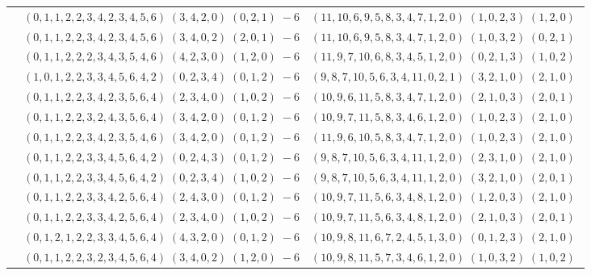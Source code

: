 \documentclass[11pt]{article}
\begin{document}
\begin{longtable}[l]{|c|c|c|}
 \cline{2-3} 
 & $(0 ,1 ,1 ,2 ,2 ,3 ,4 ,2 ,3 ,4 ,5 ,6) \;(3 ,4 ,2 ,0) \;(0 ,2 ,1) \;-6$ & $(11 ,10 ,6 ,9 ,5 ,8 ,3 ,4 ,7 ,1 ,2 ,0) \;(1 ,0 ,2 ,3) \;(1 ,2 ,0) \;$\\ 
 \cline{2-3} 
 & $(0 ,1 ,1 ,2 ,2 ,3 ,4 ,2 ,3 ,4 ,5 ,6) \;(3 ,4 ,0 ,2) \;(2 ,0 ,1) \;-6$ & $(11 ,10 ,6 ,9 ,5 ,8 ,3 ,4 ,7 ,1 ,2 ,0) \;(1 ,0 ,3 ,2) \;(0 ,2 ,1) \;$\\ 
 \cline{2-3} 
 & $(0 ,1 ,1 ,2 ,2 ,2 ,3 ,4 ,3 ,5 ,4 ,6) \;(4 ,2 ,3 ,0) \;(1 ,2 ,0) \;-6$ & $(11 ,9 ,7 ,10 ,6 ,8 ,3 ,4 ,5 ,1 ,2 ,0) \;(0 ,2 ,1 ,3) \;(1 ,0 ,2) \;$\\ 
 \cline{2-3} 
 & $(1 ,0 ,1 ,2 ,2 ,3 ,3 ,4 ,5 ,6 ,4 ,2) \;(0 ,2 ,3 ,4) \;(0 ,1 ,2) \;-6$ & $(9 ,8 ,7 ,10 ,5 ,6 ,3 ,4 ,11 ,0 ,2 ,1) \;(3 ,2 ,1 ,0) \;(2 ,1 ,0) \;$\\ 
 \cline{2-3} 
 & $(0 ,1 ,1 ,2 ,2 ,3 ,4 ,2 ,3 ,5 ,6 ,4) \;(2 ,3 ,4 ,0) \;(1 ,0 ,2) \;-6$ & $(10 ,9 ,6 ,11 ,5 ,8 ,3 ,4 ,7 ,1 ,2 ,0) \;(2 ,1 ,0 ,3) \;(2 ,0 ,1) \;$\\ 
 \cline{2-3} 
 & $(0 ,1 ,1 ,2 ,2 ,3 ,2 ,4 ,3 ,5 ,6 ,4) \;(3 ,4 ,2 ,0) \;(0 ,1 ,2) \;-6$ & $(10 ,9 ,7 ,11 ,5 ,8 ,3 ,4 ,6 ,1 ,2 ,0) \;(1 ,0 ,2 ,3) \;(2 ,1 ,0) \;$\\ 
 \cline{2-3} 
 & $(0 ,1 ,1 ,2 ,2 ,3 ,4 ,2 ,3 ,5 ,4 ,6) \;(3 ,4 ,2 ,0) \;(0 ,1 ,2) \;-6$ & $(11 ,9 ,6 ,10 ,5 ,8 ,3 ,4 ,7 ,1 ,2 ,0) \;(1 ,0 ,2 ,3) \;(2 ,1 ,0) \;$\\ 
 \cline{2-3} 
 & $(0 ,1 ,1 ,2 ,2 ,3 ,3 ,4 ,5 ,6 ,4 ,2) \;(0 ,2 ,4 ,3) \;(0 ,1 ,2) \;-6$ & $(9 ,8 ,7 ,10 ,5 ,6 ,3 ,4 ,11 ,1 ,2 ,0) \;(2 ,3 ,1 ,0) \;(2 ,1 ,0) \;$\\ 
 \cline{2-3} 
 & $(0 ,1 ,1 ,2 ,2 ,3 ,3 ,4 ,5 ,6 ,4 ,2) \;(0 ,2 ,3 ,4) \;(1 ,0 ,2) \;-6$ & $(9 ,8 ,7 ,10 ,5 ,6 ,3 ,4 ,11 ,1 ,2 ,0) \;(3 ,2 ,1 ,0) \;(2 ,0 ,1) \;$\\ 
 \cline{2-3} 
 & $(0 ,1 ,1 ,2 ,2 ,3 ,3 ,4 ,2 ,5 ,6 ,4) \;(2 ,4 ,3 ,0) \;(0 ,1 ,2) \;-6$ & $(10 ,9 ,7 ,11 ,5 ,6 ,3 ,4 ,8 ,1 ,2 ,0) \;(1 ,2 ,0 ,3) \;(2 ,1 ,0) \;$\\ 
 \cline{2-3} 
 & $(0 ,1 ,1 ,2 ,2 ,3 ,3 ,4 ,2 ,5 ,6 ,4) \;(2 ,3 ,4 ,0) \;(1 ,0 ,2) \;-6$ & $(10 ,9 ,7 ,11 ,5 ,6 ,3 ,4 ,8 ,1 ,2 ,0) \;(2 ,1 ,0 ,3) \;(2 ,0 ,1) \;$\\ 
 \cline{2-3} 
 & $(0 ,1 ,2 ,1 ,2 ,2 ,3 ,3 ,4 ,5 ,6 ,4) \;(4 ,3 ,2 ,0) \;(0 ,1 ,2) \;-6$ & $(10 ,9 ,8 ,11 ,6 ,7 ,2 ,4 ,5 ,1 ,3 ,0) \;(0 ,1 ,2 ,3) \;(2 ,1 ,0) \;$\\ 
 \cline{2-3} 
 & $(0 ,1 ,1 ,2 ,2 ,3 ,2 ,3 ,4 ,5 ,6 ,4) \;(3 ,4 ,0 ,2) \;(1 ,2 ,0) \;-6$ & $(10 ,9 ,8 ,11 ,5 ,7 ,3 ,4 ,6 ,1 ,2 ,0) \;(1 ,0 ,3 ,2) \;(1 ,0 ,2) \;$\\ 

\end{longtable}
\end{document}
